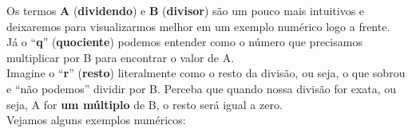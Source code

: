Os termos \textbf{A} (\textbf{dividendo}) e \textbf{B} (\textbf{divisor}) são um pouco mais intuitivos e deixaremos para visualizarmos melhor em um exemplo numérico logo a frente.\\

Já o ``\textbf{q}'' (\textbf{quociente}) podemos entender como o número que precisamos multiplicar por B para encontrar o valor de A.\\

Imagine o ``\textbf{r}'' (\textbf{resto}) literalmente como o resto da divisão, ou seja, o que sobrou e “não podemos” dividir por B. Perceba que quando nossa divisão for exata, ou seja, A for \textbf{um múltiplo} de B, o resto será igual a zero.\\

Vejamos alguns exemplos numéricos:

